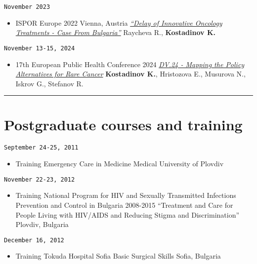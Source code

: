 \documentclass[
  12pt,
  letterpaper,
  DIV=11,
  numbers=noendperiod]{scrartcl}
\providecommand{\tightlist}{%
  \setlength{\itemsep}{0pt}\setlength{\parskip}{0pt}}\usepackage{longtable,booktabs,array}
\begin{document}
\texttt{November\ 2023}

\begin{itemize}
\tightlist
\item
  ISPOR Europe 2022 \textbar{} Vienna, Austria \textbar{}
  \href{https://www.ispor.org/heor-resources/presentations-database/presentation/euro2022-3565/120960}{\emph{``Delay
  of Innovative Oncology Treatments - Case From Bulgaria''}} \textbar{}
  Raycheva R., \textbf{Kostadinov K.}
\end{itemize}

\texttt{November\ 13-15,\ 2024}

\begin{itemize}
\tightlist
\item
  17th European Public Health Conference 2024 \textbar{}
  \href{https://ephconference.eu/app/programme/programme.php?d=displays}{\emph{DV.24
  - Mapping the Policy Alternatives for Rare Cancer}} \textbar{}
  \textbf{Kostadinov K.}, Hristozova E., Musurova N., Iskrov G.,
  Stefanov R.
\end{itemize}

\begin{center}\rule{0.5\linewidth}{0.5pt}\end{center}

\section{Postgraduate courses and
training}\label{postgraduate-courses-and-training}

\texttt{September\ 24-25,\ 2011}

\begin{itemize}
\tightlist
\item
  Training \textbar{} Emergency Care in Medicine \textbar{} Medical
  University of Plovdiv
\end{itemize}

\texttt{November\ 22-23,\ 2012}

\begin{itemize}
\tightlist
\item
  Training\textbar{} National Program for HIV and Sexually Transmitted
  Infections Prevention and Control in Bulgaria 2008-2015 \textbar{}
  ``Treatment and Care for People Living with HIV/AIDS and Reducing
  Stigma and Discrimination'' \textbar{} Plovdiv, Bulgaria
\end{itemize}

\texttt{December\ 16,\ 2012}

\begin{itemize}
\tightlist
\item
  Training\textbar{} Tokuda Hospital Sofia \textbar{} Basic Surgical
  Skills \textbar{} Sofia, Bulgaria
\end{itemize}
\end{document}
